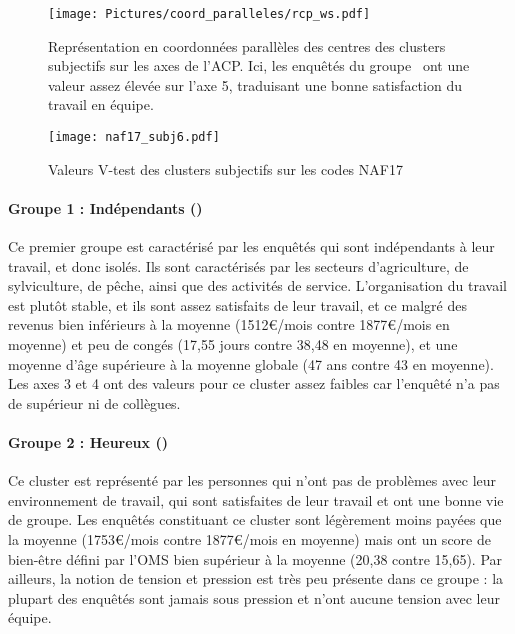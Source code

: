 \documentclass[11pt,fleqn,openany,frenchb]{book} %
\begin{document}
\begin{figure}[!h]
\centering
  \texttt{[image: Pictures/coord\_paralleles/rcp\_ws.pdf]}
\caption{{Représentation en coordonnées parallèles des centres des clusters subjectifs sur les axes de l'ACP. Ici, les enquêtés du groupe \HEUR\ ont une valeur assez élevée sur l'axe 5, traduisant une bonne satisfaction du travail en équipe.}}
\label{fig:CPsubj}
\end{figure}

\begin{figure}[!h]
\centering
  \texttt{[image: naf17\_subj6.pdf]}
\caption{Valeurs V-test des clusters subjectifs sur les codes NAF17}
\label{fig:nafsubj}
\end{figure}

\paragraph{Groupe 1 : Indépendants (\INDEP)\\}
Ce premier groupe est caractérisé par les enquêtés qui sont indépendants à leur travail, et donc isolés. Ils sont caractérisés par les secteurs d'agriculture,  de sylviculture, de pêche, ainsi que des activités de service. L'organisation du travail est plutôt stable, et ils sont assez satisfaits de leur travail, et ce malgré des revenus bien inférieurs à la moyenne (1512\euro{}/mois contre 1877\euro{}/mois en moyenne) et peu de congés (17,55 jours contre 38,48 en moyenne), et une moyenne d'âge supérieure à la moyenne globale (47 ans contre 43 en moyenne). Les axes 3 et 4 ont des valeurs pour ce cluster assez faibles car l'enquêté n'a pas de supérieur ni de collègues.

\paragraph{Groupe 2 : Heureux (\HEUR)\\}
Ce cluster est représenté par les personnes qui n'ont pas de problèmes avec leur environnement de travail, qui sont satisfaites de leur travail et ont une bonne vie de groupe. Les enquêtés constituant ce cluster sont légèrement moins payées que la moyenne (1753\euro{}/mois contre 1877\euro{}/mois en moyenne) mais ont un score de bien-être défini par l'OMS bien supérieur à la moyenne (20,38 contre 15,65). Par ailleurs, la notion de tension et pression est très peu présente dans ce groupe : la plupart des enquêtés sont jamais sous pression et n'ont aucune tension avec leur équipe.
\end{document}
